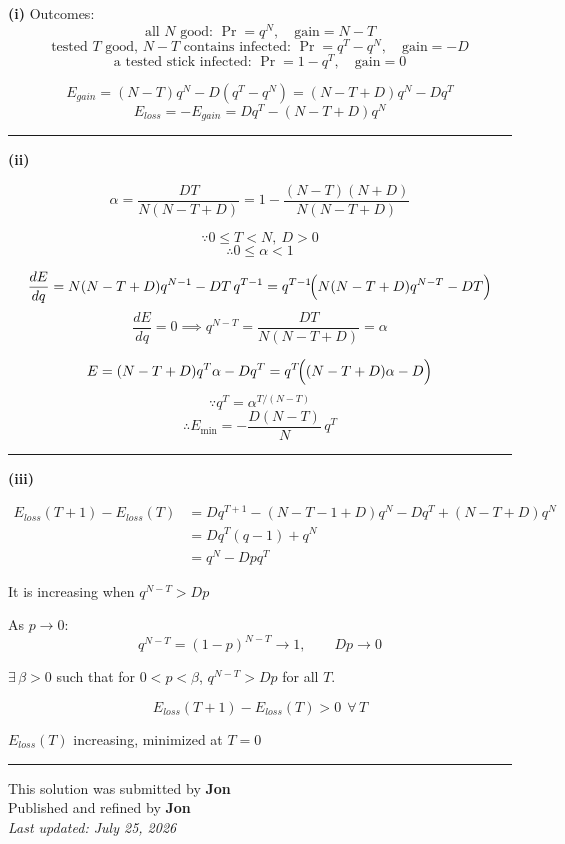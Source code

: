 \documentclass[12pt]{article}
\begin{document}
\newcommand{\ds}{\displaystyle}

\textbf{(i)} Outcomes:
$$\text{all }N\text{ good: }\Pr=q^N,\quad \text{gain}=N-T$$
$$\text{tested }T\text{ good, }N-T\text{ contains infected: }\Pr=q^T-q^N,\quad \text{gain}=-D$$
$$\text{a tested stick infected: }\Pr=1-q^T,\quad \text{gain}=0$$

$$E_{gain}=(N-T)q^N-D(q^T-q^N)=(N-T+D)q^N-Dq^T$$
$$E_{loss}=-E_{gain}=Dq^T-(N-T+D)q^N$$

\bigskip\hrule\bigskip

\textbf{(ii)}

$$\alpha=\frac{DT}{N(N-T+D)}=1-\frac{(N-T)(N+D)}{N(N-T+D)}$$

$$\because 0\le T<N,\ D>0$$
$$\therefore 0\le \alpha<1$$

$$\frac{dE}{dq}=N(N-T+D)q^{N-1}-DT\,q^{T-1}=q^{T-1}\!\Bigl(N(N-T+D)q^{N-T}-DT\Bigr)$$
$$\frac{dE}{dq}=0\implies q^{N-T}=\frac{DT}{N(N-T+D)}=\alpha$$

$$E=(N-T+D)q^T\alpha-Dq^T=q^T\!\Bigl((N-T+D)\alpha-D\Bigr)$$
$$\because q^T=\alpha^{T/(N-T)}$$
$$\therefore E_{\min}=-\frac{D(N-T)}{N}\,q^T$$

\bigskip\hrule\bigskip

\textbf{(iii)}

\begin{align*}
E_{loss}(T+1)-E_{loss}(T)
&=Dq^{T+1}-(N-T-1+D)q^N-Dq^T+(N-T+D)q^N\\
&=Dq^T(q-1)+q^N\\
&=q^N-Dpq^T
\end{align*}

It is increasing when $q^{N-T}>Dp$

As $p\to0$:
$$q^{N-T}=(1-p)^{N-T}\to1,\qquad Dp\to0$$

$\exists\,\beta>0$ such that for $0<p<\beta$, $q^{N-T}>Dp$ for all $T$.

$$E_{loss}(T+1)-E_{loss}(T)>0\ \ \forall\,T$$

$E_{loss}(T)$ increasing, minimized at $T=0$
\bigskip
\hrule
\begin{center}
    This solution was submitted by \textbf{Jon}\\[4pt]
    Published and refined by \textbf{Jon}\\[8pt]
    \textit{Last updated: July 25, 2026}
\end{center}
\end{document}
